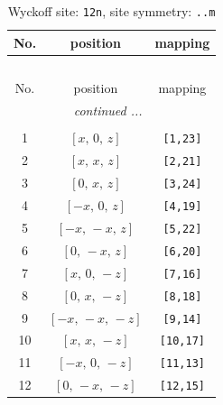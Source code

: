 \documentclass[fleqn,8pt]{jsarticle}
\begin{document}
\begin{longtable}{ccc}
\caption{Wyckoff site: {\tt 12n}, site symmetry: {\tt ..m}}
 \\
 \hline \hline
No. & position & mapping \\ \hline \endfirsthead

\multicolumn{2}{l}{\tablename\ \thetable{}} \\
 \hline \hline
No. & position & mapping \\ \hline \endhead

 \hline \hline
\multicolumn{2}{r}{\footnotesize\it continued ...} \\ \endfoot

 \hline \hline
\multicolumn{2}{r}{} \\ \endlastfoot

1 & $\left[ x,\, 0,\, z \right]$ & {\tt [1,23]} \\ \hline
2 & $\left[ x,\, x,\, z \right]$ & {\tt [2,21]} \\ \hline
3 & $\left[ 0,\, x,\, z \right]$ & {\tt [3,24]} \\ \hline
4 & $\left[ - x,\, 0,\, z \right]$ & {\tt [4,19]} \\ \hline
5 & $\left[ - x,\, - x,\, z \right]$ & {\tt [5,22]} \\ \hline
6 & $\left[ 0,\, - x,\, z \right]$ & {\tt [6,20]} \\ \hline
7 & $\left[ x,\, 0,\, - z \right]$ & {\tt [7,16]} \\ \hline
8 & $\left[ 0,\, x,\, - z \right]$ & {\tt [8,18]} \\ \hline
9 & $\left[ - x,\, - x,\, - z \right]$ & {\tt [9,14]} \\ \hline
10 & $\left[ x,\, x,\, - z \right]$ & {\tt [10,17]} \\ \hline
11 & $\left[ - x,\, 0,\, - z \right]$ & {\tt [11,13]} \\ \hline
12 & $\left[ 0,\, - x,\, - z \right]$ & {\tt [12,15]} \\
\end{longtable}
\renewcommand{\arraystretch}{1.2}
\end{document}

